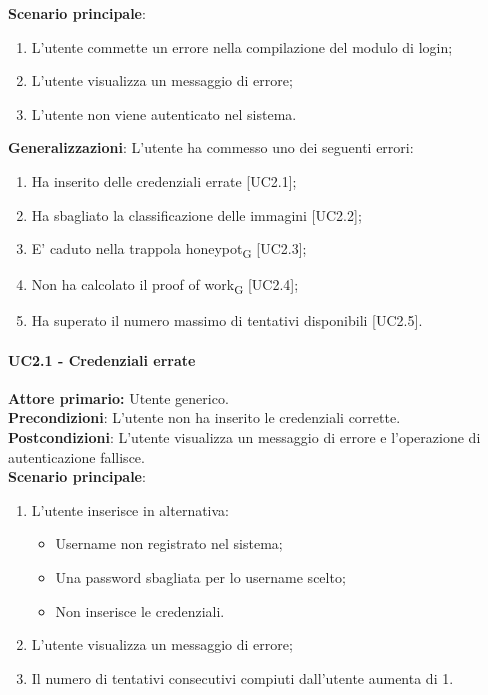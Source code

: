 \textbf{Scenario principale}:
\begin{enumerate}
   \item L’utente commette un errore nella compilazione del modulo di login;
   \item L'utente visualizza un messaggio di errore;
   \item L'utente non viene autenticato nel sistema.
\end{enumerate}

\textbf{Generalizzazioni}: L'utente ha commesso uno dei seguenti errori:
\begin{enumerate}
	\item Ha inserito delle credenziali errate [UC2.1];
	\item Ha sbagliato la classificazione delle immagini [UC2.2];
	\item E' caduto nella trappola honeypot\textsubscript{G} [UC2.3];
	\item Non ha calcolato il proof of work\textsubscript{G} [UC2.4];
	\item Ha superato il numero massimo di tentativi disponibili [UC2.5].
\end{enumerate}

\paragraph{UC2.1 - Credenziali errate}
\textbf{Attore primario:} Utente generico.\\
\textbf{Precondizioni}: L’utente non ha inserito le credenziali corrette.\\
\textbf{Postcondizioni}: L’utente visualizza un messaggio di errore e l’operazione di autenticazione fallisce.\\

\textbf{Scenario principale}:
\begin{enumerate}
    \item L'utente inserisce in alternativa:
        \begin{itemize}
            \item Username non registrato nel sistema;
            \item Una password sbagliata per lo username scelto;
            \item Non inserisce le credenziali.
        \end{itemize}
	\item L’utente visualizza un messaggio di errore;
	\item Il numero di tentativi consecutivi compiuti dall’utente aumenta di 1.
\end{enumerate}

